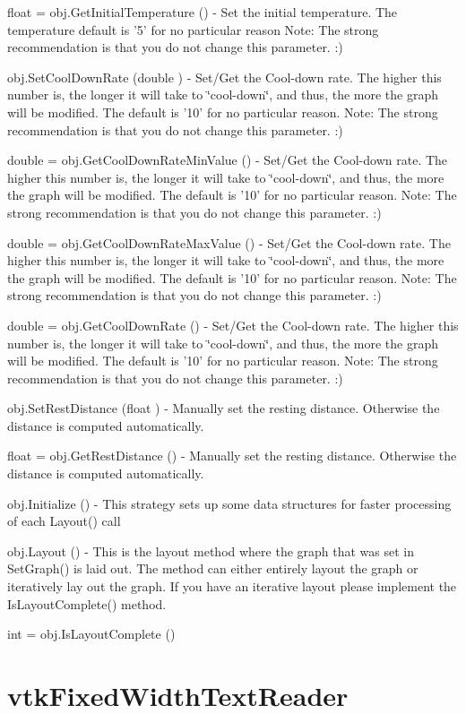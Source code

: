 \begin{DoxyItemize}
\item {\ttfamily float = obj.\-Get\-Initial\-Temperature ()} -\/ Set the initial temperature. The temperature default is '5' for no particular reason Note\-: The strong recommendation is that you do not change this parameter. \-:)  
\item {\ttfamily obj.\-Set\-Cool\-Down\-Rate (double )} -\/ Set/\-Get the Cool-\/down rate. The higher this number is, the longer it will take to \char`\"{}cool-\/down\char`\"{}, and thus, the more the graph will be modified. The default is '10' for no particular reason. Note\-: The strong recommendation is that you do not change this parameter. \-:)  
\item {\ttfamily double = obj.\-Get\-Cool\-Down\-Rate\-Min\-Value ()} -\/ Set/\-Get the Cool-\/down rate. The higher this number is, the longer it will take to \char`\"{}cool-\/down\char`\"{}, and thus, the more the graph will be modified. The default is '10' for no particular reason. Note\-: The strong recommendation is that you do not change this parameter. \-:)  
\item {\ttfamily double = obj.\-Get\-Cool\-Down\-Rate\-Max\-Value ()} -\/ Set/\-Get the Cool-\/down rate. The higher this number is, the longer it will take to \char`\"{}cool-\/down\char`\"{}, and thus, the more the graph will be modified. The default is '10' for no particular reason. Note\-: The strong recommendation is that you do not change this parameter. \-:)  
\item {\ttfamily double = obj.\-Get\-Cool\-Down\-Rate ()} -\/ Set/\-Get the Cool-\/down rate. The higher this number is, the longer it will take to \char`\"{}cool-\/down\char`\"{}, and thus, the more the graph will be modified. The default is '10' for no particular reason. Note\-: The strong recommendation is that you do not change this parameter. \-:)  
\item {\ttfamily obj.\-Set\-Rest\-Distance (float )} -\/ Manually set the resting distance. Otherwise the distance is computed automatically.  
\item {\ttfamily float = obj.\-Get\-Rest\-Distance ()} -\/ Manually set the resting distance. Otherwise the distance is computed automatically.  
\item {\ttfamily obj.\-Initialize ()} -\/ This strategy sets up some data structures for faster processing of each Layout() call  
\item {\ttfamily obj.\-Layout ()} -\/ This is the layout method where the graph that was set in Set\-Graph() is laid out. The method can either entirely layout the graph or iteratively lay out the graph. If you have an iterative layout please implement the Is\-Layout\-Complete() method.  
\item {\ttfamily int = obj.\-Is\-Layout\-Complete ()}  
\end{DoxyItemize}\hypertarget{vtkinfovis_vtkfixedwidthtextreader}{}\section{vtk\-Fixed\-Width\-Text\-Reader}\label{vtkinfovis_vtkfixedwidthtextreader}
